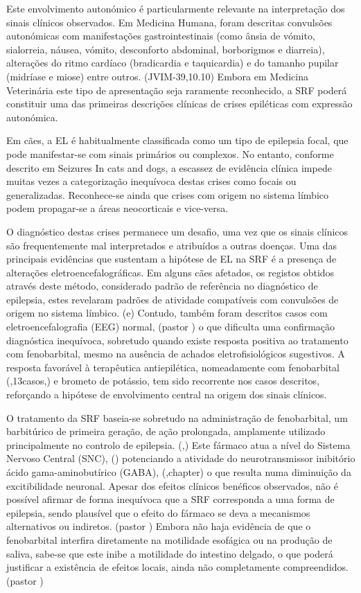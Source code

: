 Este envolvimento autonómico é particularmente relevante na interpretação dos sinais clínicos observados. Em Medicina Humana, foram descritas convulsões autonómicas com manifestações gastrointestinais (como ânsia de vómito, sialorreia, náusea, vómito, desconforto abdominal, borborigmos e diarreia), alterações do ritmo cardíaco (bradicardia e taquicardia) e do tamanho pupilar (midríase e miose) entre outros. (JVIM-39,10.10) Embora em Medicina Veterinária este tipo de apresentação seja raramente reconhecido, a SRF poderá constituir uma das primeiras descrições clínicas de crises epiléticas com expressão autonómica. \cite{Diop2025}


Em cães, a EL é habitualmente classificada como um tipo de epilepsia focal, que pode manifestar-se com sinais primários ou complexos. No entanto, conforme descrito em Seizures In cats and dogs, a escassez de evidência clínica impede muitas vezes a categorização inequívoca destas crises como focais ou generalizadas. Reconhece-se ainda que crises com origem no sistema límbico podem propagar-se a áreas neocorticais e vice-versa. 


O diagnóstico destas crises permanece um desafio, uma vez que os sinais clínicos são frequentemente mal interpretados e atribuídos a outras doenças. \cite{Diop2025}
Uma das principais evidências que sustentam a hipótese de EL na SRF é a presença de alterações eletroencefalográficas. Em alguns cães afetados, os registos obtidos através deste método, considerado padrão de referência no diagnóstico de epilepsia, estes revelaram padrões de atividade compatíveis com convulsões de origem no sistema límbico. (\cite{alemao}e) Contudo, também foram descritos casos com eletroencefalografia (EEG) normal, (pastor \cite{alemao}) o que dificulta uma confirmação diagnóstica inequívoca, sobretudo quando existe resposta positiva ao tratamento com fenobarbital, mesmo na ausência de achados eletrofisiológicos sugestivos.
A resposta favorável à terapêutica antiepilética, nomeadamente com fenobarbital (\cite{Alcoverro2014},13casos,\cite{alemao}) e brometo de potássio, \cite{Alcoverro2014} tem sido recorrente nos casos descritos, reforçando a hipótese de envolvimento central na origem dos sinais clínicos.


O tratamento da SRF baseia-se sobretudo na administração de fenobarbital, um barbitúrico de primeira geração, de ação prolongada, amplamente utilizado principalmente no controlo de epilepsia. (\cite{papich},\cite{scott2021}) Este fármaco atua a nível do Sistema Nervoso Central (SNC), (\cite{papich}) potenciando a atividade do neurotransmissor inibitório ácido gama-aminobutírico (GABA), (\cite{Trinka2023},chapter) o que resulta numa diminuição da excitibilidade neuronal. Apesar dos efeitos clínicos benéficos observados, não é possível afirmar de forma inequívoca que a SRF corresponda a uma forma de epilepsia, sendo plausível que o efeito do fármaco se deva a mecanismos alternativos ou indiretos. (pastor \cite{alemao}) Embora não haja evidência de que o fenobarbital interfira diretamente na motilidade esofágica ou na produção de saliva, sabe-se que este inibe a motilidade do intestino delgado, o que poderá justificar a existência de efeitos locais, ainda não completamente compreendidos. (pastor \cite{alemao})


